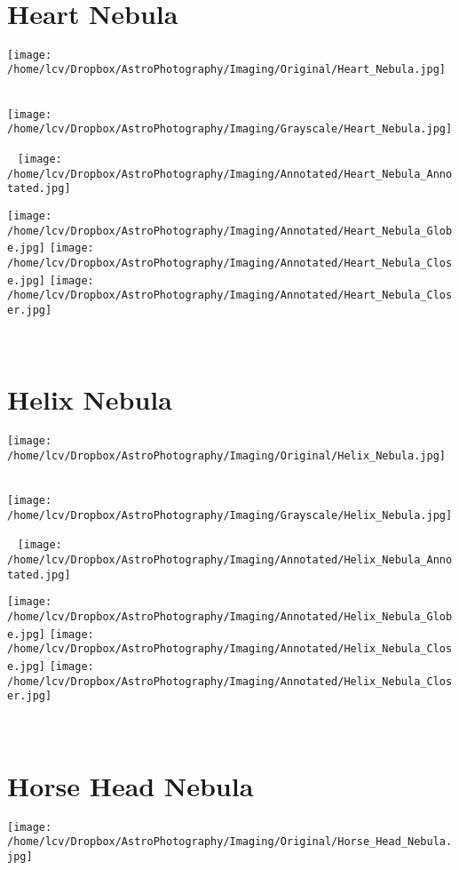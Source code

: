 \ \\\section{Heart Nebula}
\texttt{[image: /home/lcv/Dropbox/AstroPhotography/Imaging/Original/Heart\_Nebula.jpg]}
{\footnotesize\color{white}


}\ \\
\texttt{[image: /home/lcv/Dropbox/AstroPhotography/Imaging/Grayscale/Heart\_Nebula.jpg]}
\begin{center}
 \ \newpage
\texttt{[image: /home/lcv/Dropbox/AstroPhotography/Imaging/Annotated/Heart\_Nebula\_Annotated.jpg]}

\texttt{[image: /home/lcv/Dropbox/AstroPhotography/Imaging/Annotated/Heart\_Nebula\_Globe.jpg]}
\texttt{[image: /home/lcv/Dropbox/AstroPhotography/Imaging/Annotated/Heart\_Nebula\_Close.jpg]}
\texttt{[image: /home/lcv/Dropbox/AstroPhotography/Imaging/Annotated/Heart\_Nebula\_Closer.jpg]}
\end{center}
\ \\\section{Helix Nebula}
\texttt{[image: /home/lcv/Dropbox/AstroPhotography/Imaging/Original/Helix\_Nebula.jpg]}
{\footnotesize\color{white}


}\ \\
\texttt{[image: /home/lcv/Dropbox/AstroPhotography/Imaging/Grayscale/Helix\_Nebula.jpg]}
\begin{center}
 \ \newpage
\texttt{[image: /home/lcv/Dropbox/AstroPhotography/Imaging/Annotated/Helix\_Nebula\_Annotated.jpg]}

\texttt{[image: /home/lcv/Dropbox/AstroPhotography/Imaging/Annotated/Helix\_Nebula\_Globe.jpg]}
\texttt{[image: /home/lcv/Dropbox/AstroPhotography/Imaging/Annotated/Helix\_Nebula\_Close.jpg]}
\texttt{[image: /home/lcv/Dropbox/AstroPhotography/Imaging/Annotated/Helix\_Nebula\_Closer.jpg]}
\end{center}
\ \\\section{Horse Head Nebula}
\texttt{[image: /home/lcv/Dropbox/AstroPhotography/Imaging/Original/Horse\_Head\_Nebula.jpg]}
